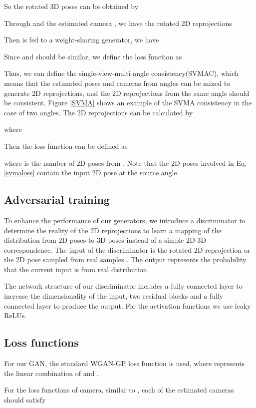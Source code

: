 \documentclass[10pt,twocolumn,letterpaper]{article}
\begin{document}
So the rotated 3D poses can be obtained by

Through  and the estimated camera , we have the rotated 2D reprojections

Then  is fed to a weight-sharing generator, we have

Since
 and  should be similar, we define the loss function as
 



Thus, we can define the single-view-multi-angle consistency(SVMAC), which means that the estimated poses and cameras from  angles can be mixed to generate  2D reprojections, and the 2D reprojections from the same angle should be consistent. Figure \ref{SVMA} shows an example of the SVMA consistency in the case of two angles. The 2D reprojections can be calculated by 
 
where
 
Then the loss function can be defined as
 
where  is the number of 2D poses from . Note that the 2D poses involved in Eq. \ref{svmaloss} contain the input 2D pose at the source angle.






\subsection{Adversarial training}
To enhance the performance of our generators, we introduce a discriminator to determine the reality of the 2D reprojections to learn a mapping of the distribution from 2D poses to 3D poses instead of a simple 2D-3D correspondence. 
The input of the discriminator is the rotated 2D reprojection  or the 2D pose sampled from real samples . The output represents the probability that the current input is from real distribution.


The network structure of our discriminator includes a fully connected layer to increase the dimensionality of the input, two residual blocks and a fully connected layer to produce the output. For the activation functions we use leaky ReLUs.

\subsection{Loss functions}
For our GAN, the standard WGAN-GP loss function\cite{wgangp} is used,  
where  represents the linear combination of  and .

For the loss functions of camera, similar to \cite{2019RepNet}, each of the estimated cameras should satisfy
 
\end{document}
